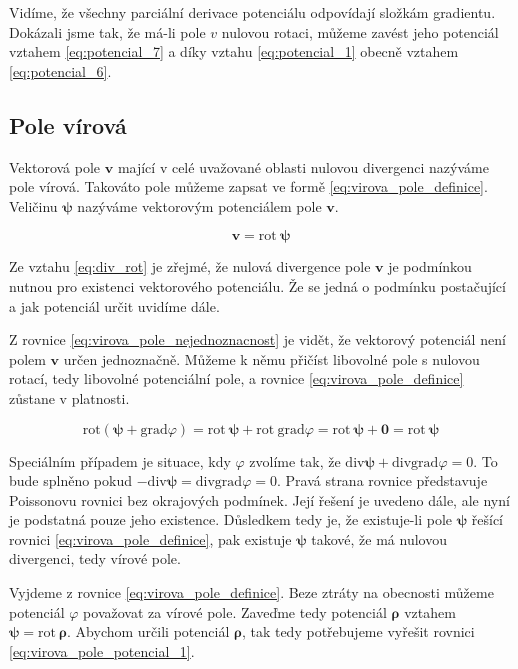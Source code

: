 \documentclass{book}
\newcommand{\vect}[1]{\boldsymbol{#1}}
\newcommand{\grad}{\mathrm{grad}}
\newcommand{\diverg}{\mathrm{div}}
\newcommand{\rot}{\mathrm{rot}}
\begin{document}
Vidíme, že všechny parciální derivace potenciálu odpovídají složkám gradientu. Dokázali jsme tak, že má-li pole \(v\) nulovou rotaci, můžeme zavést jeho
potenciál vztahem \eqref{eq:potencial_7} a díky vztahu \eqref{eq:potencial_1} obecně vztahem \eqref{eq:potencial_6}.

\subsection{Pole vírová}
\label{sec:pole_virova}

Vektorová pole \(\vect{v}\) mající v celé uvažované oblasti nulovou divergenci nazýváme pole vírová. Takováto pole můžeme zapsat ve formě 
\eqref{eq:virova_pole_definice}. Veličinu \(\vect{\psi}\) nazýváme vektorovým potenciálem pole \(\vect{v}\).

\begin{equation}
\label{eq:virova_pole_definice}
\vect{v} = \rot \ \vect{\psi}
\end{equation}

Ze vztahu \eqref{eq:div_rot} je zřejmé, že nulová divergence pole \(\vect{v}\) je podmínkou nutnou pro existenci vektorového potenciálu. Že se jedná o podmínku postačující a jak potenciál určit uvidíme dále.

Z rovnice \eqref{eq:virova_pole_nejednoznacnost} je vidět, že vektorový potenciál není polem \(\vect{v}\) určen jednoznačně.
Můžeme k němu přičíst libovolné pole s nulovou rotací, tedy libovolné potenciální pole, a rovnice \eqref{eq:virova_pole_definice}
zůstane v platnosti.

\begin{equation}
\label{eq:virova_pole_nejednoznacnost}
\rot \left(\vect{\psi} + \grad \varphi \right) = \rot \ \vect{\psi} + \rot \ \grad \varphi =
\rot \ \vect{\psi} + \vect{0} = \rot \ \vect{\psi}
\end{equation}

Speciálním případem je situace, kdy \(\varphi\) zvolíme tak, že \(\diverg \vect{\psi} + \diverg \grad \varphi = 0\). To bude splněno pokud
\(-\diverg \vect{\psi} = \diverg \grad \varphi = 0\). Pravá strana rovnice představuje Poissonovu rovnici bez okrajových podmínek.
Její řešení je uvedeno dále, ale nyní je podstatná pouze jeho existence. Důsledkem tedy je, že existuje-li pole \(\vect{\psi}\) řešící
rovnici \eqref{eq:virova_pole_definice}, pak existuje \(\vect{\psi}\) takové, že má nulovou divergenci, tedy vírové pole.

Vyjdeme z rovnice \eqref{eq:virova_pole_definice}. Beze ztráty na obecnosti můžeme potenciál \(\varphi\) považovat za vírové pole.
Zaveďme tedy potenciál \(\vect{\rho}\) vztahem \(\vect{\psi} = \rot \ \vect{\rho}\). Abychom určili potenciál \(\vect{\rho}\), tak tedy
potřebujeme vyřešit rovnici \eqref{eq:virova_pole_potencial_1}.
\end{document}
